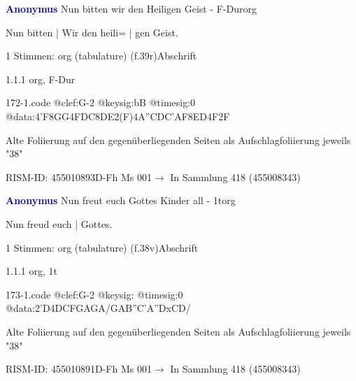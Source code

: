 \documentclass[twocolumn]{book}
\begin{document}
\par \vspace{7pt} \textcolor{darkblue}{\textbf{Anonymus  }}\hfillplus{\textbf{[172]}}\newline Nun bitten wir den Heiligen Geist - F-Dur\newline org
\par \begin{itshape}[f.39r, at left:] Nun bitten | Wir den heili= | gen Geist.\end{itshape} 
\par \textcolor{darkblue}{}  1 Stimmen: org (tabulature)  (f.39r)\newline Abschrift
\par 1.1.1  org, F-Dur  
\begin{filecontents*}{172-1.code}
@clef:G-2
@keysig:bB
@timesig:0
@data:4'F{8GG}4FDC{8DE}2(F)4A''CDC'AF{8ED}4F2F
\end{filecontents*}
\newline
%
\par Alte Foliierung auf den gegenüberliegenden Seiten als Aufschlagfoliierung jeweils "38"
\par RISM-ID: 455010893\newline D-Fh  Ms 001\newline $\rightarrow$ In Sammlung 418 (455008343)
      
\par \vspace{7pt} \textcolor{darkblue}{\textbf{Anonymus  }}\hfillplus{\textbf{[173]}}\newline Nun freut euch Gottes Kinder all - 1t\newline org
\par \begin{itshape}[f.38v, at left:] Nun freud euch | Gottes.\end{itshape} 
\par \textcolor{darkblue}{}  1 Stimmen: org (tabulature)  (f.38v)\newline Abschrift
\par 1.1.1  org, 1t  
\begin{filecontents*}{173-1.code}
@clef:G-2
@keysig:
@timesig:0
@data:2'D4DCFGAGA/GAB''C'A''DxCD/
\end{filecontents*}
\newline
%
\par Alte Foliierung auf den gegenüberliegenden Seiten als Aufschlagfoliierung jeweils "38"
\par RISM-ID: 455010891\newline D-Fh  Ms 001\newline $\rightarrow$ In Sammlung 418 (455008343)
      
\end{document}
